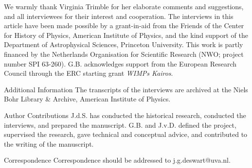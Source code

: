 \documentclass{naturefig}
\begin{document}
\begin{addendum}
  \setlength\itemsep{0em}

 \item We warmly thank Virginia Trimble for her elaborate comments and suggestions, and all interviewees for their interest and cooperation. The interviews in this article have been made possible by a grant-in-aid from the Friends of the Center for History of Physics, American Institute of Physics, and the kind support of the Department of Astrophysical Sciences, Princeton University. This work is partly financed by the Netherlands Organisation for Scientific Research (NWO; project number SPI 63-260). G.B. acknowledges support from the European Research Council through the ERC starting grant {\it WIMPs Kairos}.
 \item[Additional Information] The transcripts of the interviews are archived at the Niels Bohr Library \& Archive, American Institute of Physics.
 \item[Author Contributions] J.d.S. has conducted the historical research, conducted the interviews, and prepared the manuscript. G.B. and J.v.D. defined the project, supervised the research, gave technical and conceptual advice, and contributed to the writing of the manuscript.
 
  \item[Correspondence] Correspondence  should be addressed to j.g.deswart@uva.nl.

\end{addendum}
\vspace{12pt}
\end{document}
